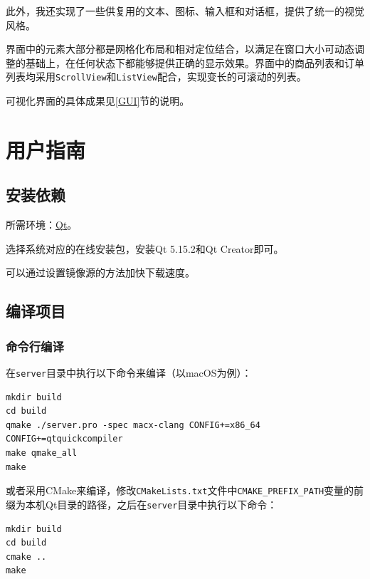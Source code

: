 \documentclass[lang=cn,11pt,a4paper,cite=authornum]{paper}
\begin{document}
此外，我还实现了一些供复用的文本、图标、输入框和对话框，提供了统一的视觉风格。

界面中的元素大部分都是网格化布局和相对定位结合，以满足在窗口大小可动态调整的基础上，在任何状态下都能够提供正确的显示效果。界面中的商品列表和订单列表均采用\texttt{ScrollView}和\texttt{ListView}配合，实现变长的可滚动的列表。

可视化界面的具体成果见\ref{GUI}节的说明。

\section{用户指南}

\subsection{安装依赖}

所需环境：\href{https://mirrors.tuna.tsinghua.edu.cn/qt/official_releases/online_installers/}{Qt}。

选择系统对应的在线安装包，安装Qt 5.15.2和Qt Creator即可。

可以通过设置镜像源的方法加快下载速度。

\subsection{编译项目}

\subsubsection{命令行编译}

在\texttt{server}目录中执行以下命令来编译（以macOS为例）：

\begin{code}
\begin{verbatim}
mkdir build
cd build
qmake ./server.pro -spec macx-clang CONFIG+=x86_64 CONFIG+=qtquickcompiler 
make qmake_all
make
\end{verbatim}
\end{code}

或者采用CMake来编译，修改\texttt{CMakeLists.txt}文件中\texttt{CMAKE_PREFIX_PATH}变量的前缀为本机Qt目录的路径，之后在\texttt{server}目录中执行以下命令：

\begin{code}
\begin{verbatim}
mkdir build
cd build
cmake ..
make
\end{verbatim}
\end{code}
\end{document}

